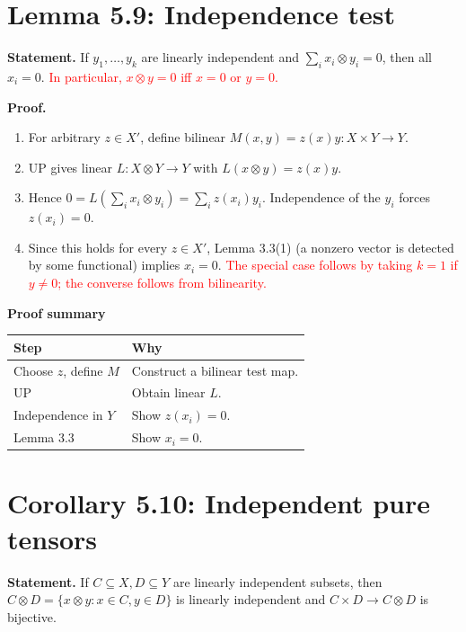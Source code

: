 \documentclass[11pt,a4paper]{article}
\newenvironment{proofsteps}{\begin{enumerate}\setlength{\itemsep}{4pt}}{\end{enumerate}}
\newcommand{\prooftable}[1]{\medskip\textbf{Proof summary}\par\smallskip #1\medskip}
\begin{document}
\section*{Lemma 5.9: Independence test}
\textbf{Statement.} If \(y_1,\ldots,y_k\) are linearly independent and \(\sum_i x_i\otimes y_i=0\), then all \(x_i=0\). \textcolor{red}{In particular, \(x\otimes y=0\) iff \(x=0\) or \(y=0\).}

\textbf{Proof.}
\begin{proofsteps}
\item For arbitrary \(z\in X'\), define bilinear \(M(x,y)=z(x)y:X\times Y\to Y\).
\item UP gives linear \(L:X\otimes Y\to Y\) with \(L(x\otimes y)=z(x)y\).
\item Hence \(0=L(\sum_i x_i\otimes y_i)=\sum_i z(x_i)y_i\). Independence of the \(y_i\) forces \(z(x_i)=0\).
\item Since this holds for every \(z\in X'\), Lemma 3.3(1) (a nonzero vector is detected by some functional) implies \(x_i=0\). \textcolor{red}{The special case follows by taking \(k=1\) if \(y\neq0\); the converse follows from bilinearity.}
\end{proofsteps}
\prooftable{\begin{tabularx}{\linewidth}{@{}p{.28\linewidth}X@{}}\hline
Step & Why\\\hline
Choose \(z\), define \(M\) & Construct a bilinear test map.\\
UP & Obtain linear \(L\).\\
Independence in \(Y\) & Show \(z(x_i)=0\).\\
Lemma 3.3 & Show \(x_i=0\).\\\hline
\end{tabularx}}

\section*{Corollary 5.10: Independent pure tensors}
\textbf{Statement.} If \(C\subseteq X,D\subseteq Y\) are linearly independent subsets, then 
\newline\(C\otimes D=\{x\otimes y:x\in C,y\in D\}\) is linearly independent and \(C\times D\to C\otimes D\) is bijective.
\end{document}
